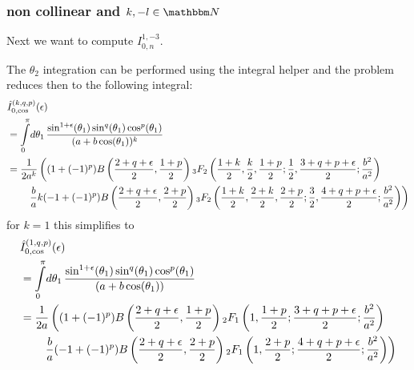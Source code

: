 \subsubsection{non collinear and $k,-l\in\mathbbm N$}
Next we want to compute $I_{0,n}^{1,-3}$.

The $\theta_2$ integration can be performed using the integral helper and the problem reduces then to the following integral:
\begin{align}
&\hat I_{0,\cos}^{(k,q,p)}(\epsilon) \nonumber\\
&= \int\limits_0^\pi\!d\theta_1\, \frac{\sin^{1+\epsilon}(\theta_1)\sin^q(\theta_1) \cos^p(\theta_1)}{(a+b\cos(\theta_1))^k}\\
&= \frac 1 {2a^k}\left((1+(-1)^p)B\left(\frac{2+q+\epsilon}{2},\frac{1+p}{2}\right){}_{3}F_{2} \left(\frac{1+k}{2},\frac k 2,\frac{1+p}{2};\frac{1}{2},\frac{3+q+p+\epsilon}{2};\frac{b^2}{a^2}\right)\right.\nonumber\\
 &\hspace{20pt}\left. \frac b a k(-1+(-1)^p)B\left(\frac{2+q+\epsilon}{2},\frac{2+p}{2}\right){}_{3}F_{2}\left(\frac{1+k} 2,\frac{2+k}{2},\frac{2+p}{2};\frac{3}{2},\frac{4+q+p+\epsilon}{2};\frac{b^2}{a^2}\right) \right)
\end{align}
for $k=1$ this simplifies to
\begin{align}
&\hat I_{0,\cos}^{(1,q,p)}(\epsilon) \nonumber\\
&= \int\limits_0^\pi\!d\theta_1\, \frac{\sin^{1+\epsilon}(\theta_1)\sin^q(\theta_1) \cos^p(\theta_1)}{(a+b\cos(\theta_1))}\\
&= \frac 1 {2a}\left((1+(-1)^p)B\left(\frac{2+q+\epsilon}{2},\frac{1+p}{2}\right){}_{2}F_{1} \left(1,\frac{1+p}{2};\frac{3+q+p+\epsilon}{2};\frac{b^2}{a^2}\right)\right.\nonumber\\
 &\hspace{20pt}\left. \frac b a (-1+(-1)^p)B\left(\frac{2+q+\epsilon}{2},\frac{2+p}{2}\right){}_{2}F_{1}\left(1,\frac{2+p}{2};\frac{4+q+p+\epsilon}{2};\frac{b^2}{a^2}\right) \right)
\end{align}

